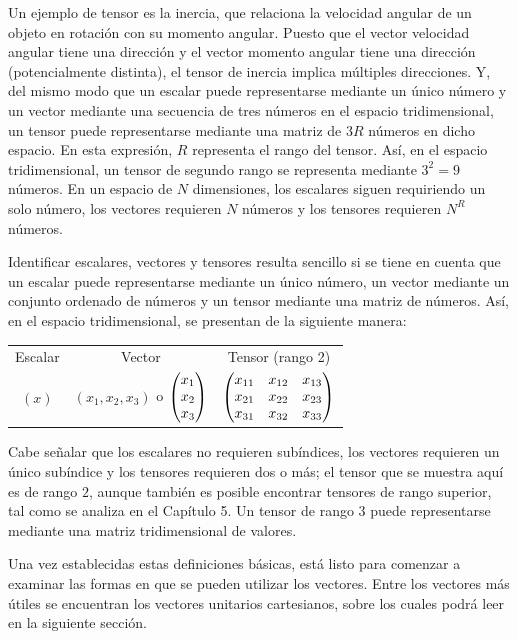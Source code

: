 \documentclass[hidelinks,12pt]{article}
\begin{document}
Un ejemplo de tensor es la inercia, que relaciona la velocidad angular de un objeto en rotación con su momento angular. Puesto que el vector velocidad angular tiene una dirección y el vector momento angular tiene una dirección (potencialmente distinta), el tensor de inercia implica múltiples direcciones. Y, del mismo modo que un escalar puede representarse mediante un único número y un vector mediante una secuencia de tres números en el espacio tridimensional, un tensor puede representarse mediante una matriz de $3 R$ números en dicho espacio. En esta expresión, $R$ representa el rango del tensor. Así, en el espacio tridimensional, un tensor de segundo rango se representa mediante $3^{2} = 9$ números. En un espacio de $N$ dimensiones, los escalares siguen requiriendo un solo número, los vectores requieren $N$ números y los tensores requieren $N^{R}$ números.
\par
Identificar escalares, vectores y tensores resulta sencillo si se tiene en cuenta que un escalar puede representarse mediante un único número, un vector mediante un conjunto ordenado de números y un tensor mediante una matriz de números. Así, en el espacio tridimensional, se presentan de la siguiente manera:

\begin{table}[H]
    \centering
    \begin{tabular}{c c c}
        Escalar & Vector & Tensor (rango 2) \\
        $(x)$ & $(x_{1}, x_{2}, x_{3})$ o $\mqty(x_{1} \\ x_{2} \\ x_{3})$ & $\mqty(x_{11} & x_{12} & x_{13} \\
            x_{21} & x_{22} & x_{23} \\
            x_{31} & x_{32} & x_{33}
        )$        
    \end{tabular}
\end{table}

Cabe señalar que los escalares no requieren subíndices, los vectores requieren un único subíndice y los tensores requieren dos o más; el tensor que se muestra aquí es de rango $2$, aunque también es posible encontrar tensores de rango superior, tal como se analiza en el Capítulo 5. Un tensor de rango $3$ puede representarse mediante una matriz tridimensional de valores.
\par
Una vez establecidas estas definiciones básicas, está listo para comenzar a examinar las formas en que se pueden utilizar los vectores. Entre los vectores más útiles se encuentran los vectores unitarios cartesianos, sobre los cuales podrá leer en la siguiente sección.
\end{document}
